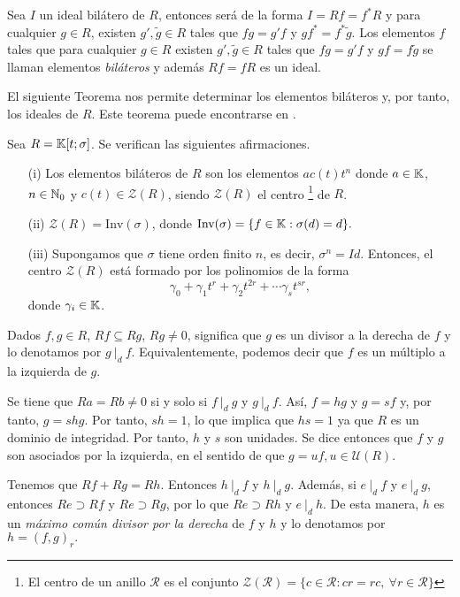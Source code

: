 Sea $I$ un ideal bilátero de $R$, entonces será de la forma $I = Rf = f^*R$ y para cualquier $g \in R$, existen $g',\tilde{g} \in R$ tales que $fg = g'f$ y $gf^* = f^*\tilde{g}$. Los elementos $f$ tales que para cualquier $g \in R$ existen $g',\tilde{g} \in R$ tales que $fg = g'f$ y $gf = f\tilde{g}$ se llaman elementos \emph{biláteros} y además $Rf = fR$ es un ideal.

El siguiente Teorema nos permite determinar los elementos biláteros y, por tanto, los ideales de $R$. Este teorema puede encontrarse en \cite[p. 5]{jacobson1996}.

\begin{teorema}\label{th:js}
Sea $R = \mathbb{K}[t;\sigma]$. Se verifican las siguientes afirmaciones.
\begin{itemize}
    \item[(i)] Los elementos biláteros de $R$ son los elementos $ac(t)t^n$ donde $a \in \mathbb{K}$, $n \in \mathbb{N}_0$ y $c(t) \in \mathcal Z(R)$, siendo $\mathcal Z(R)$ el centro \footnote{El centro de un anillo $\mathcal R$ es el conjunto $\mathcal Z(\mathcal R) = \{c \in  \mathcal R: c r = r c, \ \forall r \in \mathcal R\}$} de $R$.
    \item[(ii)] $\mathcal Z(R) = \text{Inv}(\sigma)$, donde $\text{Inv}(\sigma) = \{ f \in \mathbb{K} : \sigma(d) = d\}.$
    \item[(iii)] Supongamos que $\sigma$ tiene orden finito $n$, es decir, $\sigma^n = Id$. Entonces, el centro $\mathcal Z(R)$ está formado por los polinomios de la forma $$\gamma_0 + \gamma_1t^r + \gamma_2t^{2r} + \cdots \gamma_st^{sr},$$ donde $\gamma_i \in \mathbb{K}$.
\end{itemize}
\end{teorema}

Dados $f,g \in R$, $Rf \subseteq Rg$, $Rg \neq 0$, significa que $g$ es un divisor a la derecha de $f$ y lo denotamos por $g \ |_d \ f$.  Equivalentemente, podemos decir que $f$ es un múltiplo a la izquierda de $g$.

Se tiene que $Ra = Rb \neq 0$ si y solo si $f \ |_d \ g$ y $g \ |_d \ f$. Así, $f = hg$ y $g = sf$ y, por tanto, $g = shg$. Por tanto, $sh = 1$, lo que implica que $hs = 1$ ya que $R$ es un dominio de integridad. Por tanto, $h$ y $s$ son unidades. Se dice entonces que $f$ y $g$ son asociados por la izquierda, en el sentido de que $g = uf, u \in \mathcal U(R)$.

Tenemos que $Rf + Rg = Rh$. Entonces $ h \ |_d \ f$ y $ h \ |_d \ g$. Además, si $e \ |_d \ f$ y $e \ |_d \ g$, entonces $Re \supset Rf$ y $Re \supset Rg$, por lo que $Re \supset Rh$ y $ e \ |_d \ h$. De esta manera, $h$ es un \emph{máximo común divisor por la derecha} de $f$ y $h$ y lo denotamos por $h = (f,g)_r.$

